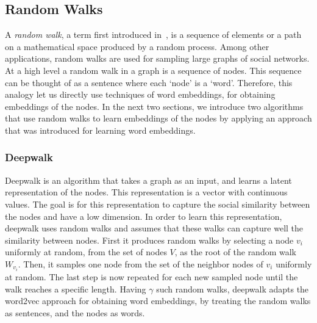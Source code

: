 \subsection{Random Walks}

A \emph{random walk}, a term first introduced in~\cite{pearson1905problem}, 
is a sequence of elements or a path on a mathematical space 
produced by a random process. Among other applications, random walks are used 
for sampling large graphs of social networks.
At a high level a random walk in a graph is a sequence of nodes. This sequence 
can be thought of as a sentence where each `node' is a `word'. Therefore, this 
analogy let us directly use techniques of word embeddings, for obtaining 
embeddings of the nodes. In the next two sections, we introduce 
two algorithms that use random walks to learn embeddings of the nodes 
by applying an approach that was introduced for learning word embeddings.

\subsubsection{Deepwalk}

Deepwalk is an algorithm that takes a graph as an input, and learns a latent 
representation of the nodes. This representation is a vector with continuous 
values. The goal is for this representation to capture the social similarity 
between the nodes and have a low dimension. In order to learn this 
representation, deepwalk uses random walks and assumes that these walks can 
capture well the similarity between nodes. First it produces random walks by 
selecting a node $v_i$ uniformly at random, from the set of nodes $V$, as the 
root of the random walk $W_{v_i}$. Then, it samples one node from the set of the 
neighbor nodes of $v_i$ uniformly at random. The last step is now repeated for 
each new sampled node until the walk reaches a specific length. Having $\gamma$ 
such random walks, deepwalk adapts the word2vec approach for obtaining word 
embeddings, by treating the random walks as sentences, and the nodes as words.

